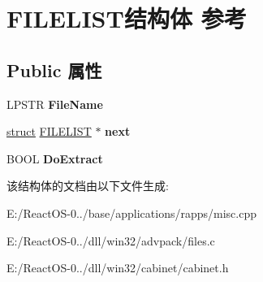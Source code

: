 \hypertarget{struct_f_i_l_e_l_i_s_t}{}\section{F\+I\+L\+E\+L\+I\+S\+T结构体 参考}
\label{struct_f_i_l_e_l_i_s_t}
\subsection*{Public 属性}
\begin{DoxyCompactItemize}
\item 
\mbox{\label{struct_f_i_l_e_l_i_s_t_ac8ba3bd32b1eb50cc021ec2fb21c349a}} 
L\+P\+S\+TR {\bfseries File\+Name}
\item 
\mbox{\label{struct_f_i_l_e_l_i_s_t_a16152d203f962df429d9b35ed1b4421b}} 
\hyperlink{interfacestruct}{struct} \hyperlink{struct_f_i_l_e_l_i_s_t}{F\+I\+L\+E\+L\+I\+ST} $\ast$ {\bfseries next}
\item 
\mbox{\label{struct_f_i_l_e_l_i_s_t_aed4897140917b1cff00e5d91bf0ef443}} 
B\+O\+OL {\bfseries Do\+Extract}
\end{DoxyCompactItemize}


该结构体的文档由以下文件生成\+:\begin{DoxyCompactItemize}
\item 
E\+:/\+React\+O\+S-\/0../base/applications/rapps/misc.\+cpp\item 
E\+:/\+React\+O\+S-\/0../dll/win32/advpack/files.\+c\item 
E\+:/\+React\+O\+S-\/0../dll/win32/cabinet/cabinet.\+h\end{DoxyCompactItemize}
